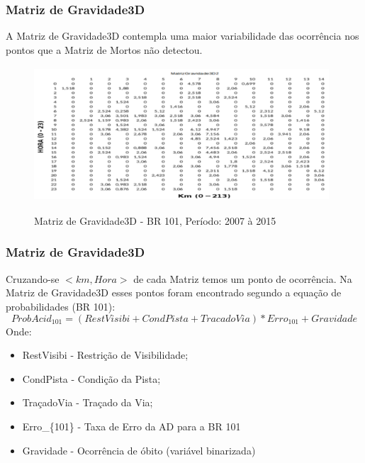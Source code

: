 \documentclass[11pt]{beamer}
\begin{document}
\begin{frame}\frametitle{ Matriz de Gravidade3D}
	A Matriz de Gravidade3D contempla uma maior variabilidade das ocorrência nos pontos que a Matriz de Mortos não detectou.
	\pause
	\transboxin[duration=1, direction=25]
	\begin{figure}[!ht]
		\centering
		\label{fig:MatrizMortos2D}
		\includegraphics[width=110mm, height=50mm]{Figuras/Metodologia/MatrizGravidade3D2.png}\\
		\caption{Matriz de Gravidade3D - BR 101, Período: 2007 à 2015}
	\end{figure}
\end{frame}

\begin{frame}\frametitle{ Matriz de Gravidade3D}
	Cruzando-se $< km, Hora >$ de cada Matriz temos um ponto de ocorrência. Na Matriz de Gravidade3D esses pontos foram encontrado segundo a equação de probabilidades (BR 101):
\pause
\begin{equation}
ProbAcid_{101} = (RestVisibi + CondPista + TracadoVia) *  Erro_{101} + Gravidade
\end{equation} 
\pause
Onde:
\begin{itemize}
	\item RestVisibi - Restrição de Visibilidade;
	\item CondPista  - Condição da Pista;
	\item TraçadoVia - Traçado da Via;
	\item Erro\_\{101\} - Taxa de Erro da AD para a BR 101
	\item Gravidade - Ocorrência de óbito (variável binarizada)
\end{itemize}
\end{frame}
\end{document}
